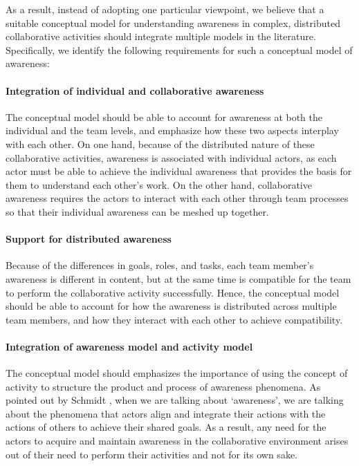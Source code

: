 As a result, instead of adopting one particular viewpoint, we believe that a suitable conceptual model for understanding awareness in complex, distributed collaborative activities should integrate multiple models in the literature. Specifically, we identify the following requirements for such a conceptual model of awareness:

\paragraph*{Integration of individual and collaborative awareness} %
\label{par:the_integration_of_individual_and_collaborative_awareness}
The conceptual model should be able to account for awareness at both the individual and the team levels, and emphasize how these two aspects interplay with each other. On one hand, because of the distributed nature of these collaborative activities, awareness is associated with individual actors, as each actor must be able to achieve the individual awareness that provides the basis for them to understand each other's work. On the other hand, collaborative awareness requires the actors to interact with each other through team processes so that their individual awareness can be meshed up together.

\paragraph*{Support for distributed awareness} %
\label{par:the_distributed_nature_of_awareness}
Because of the differences in goals, roles, and tasks, each team member's awareness is different in content, but at the same time is compatible for the team to perform the collaborative activity successfully. Hence, the conceptual model should be able to account for how the awareness is distributed across multiple team members, and how they interact with each other to achieve compatibility. 

\paragraph*{Integration of awareness model and activity model} %
\label{par:the_coupling_between_awareness_and_activity}
The conceptual model should emphasizes the importance of using the concept of activity to structure the product and process of awareness phenomena. As pointed out by Schmidt \cite{schmidt2002a}, when we are talking about `awareness', we are talking about the phenomena that actors align and integrate their actions with the actions of others to achieve their shared goals. As a result, any need for the actors to acquire and maintain awareness in the collaborative environment arises out of their need to perform their activities and not for its own sake.

